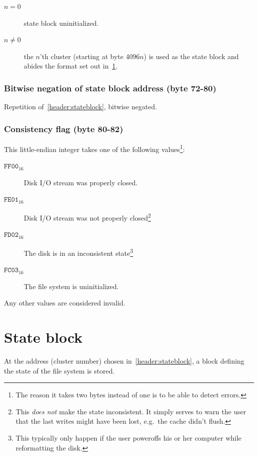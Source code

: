 \documentclass[11pt,a4paper]{report}
\newcommand{\clustersize}{4096 }
\begin{document}
        \begin{description}
            \item [$n = 0$]    state block uninitialized.
            \item [$n \neq 0$] the $n$'th cluster (starting at byte
                $\clustersize n$) is used as the state block and abides the
                format set out in~\ref{stateblock}.
        \end{description}

        \subsection{Bitwise negation of state block address (byte 72-80)}
        Repetition of~\ref{header:stateblock}, bitwise negated.

        \subsection{Consistency flag (byte 80-82)}
        \label{header:consistency}
        This little-endian integer takes one of the following
        values\footnote{The reason it takes two bytes instead of one is to be
        able to detect errors.}:

        \begin{description}
            \item [$\texttt{FF00}_{16}$] Disk I/O stream was properly closed.
            \item [$\texttt{FE01}_{16}$] Disk I/O stream was not properly
                closed\footnote{This \emph{does not} make the state
                inconsistent. It simply serves to warn the user that the last
                writes might have been lost, e.g.\ the cache didn't flush.}
            \item [$\texttt{FD02}_{16}$] The disk is in an inconsistent
                state\footnote{This typically only happen if the user poweroffs
                his or her computer while reformatting the disk.}
            \item [$\texttt{FC03}_{16}$] The file system is uninitialized.
        \end{description}

        Any other values are considered invalid.

    \chapter{State block}
    \label{stateblock}
    At the address (cluster number) chosen in~\ref{header:stateblock}, a block
    defining the state of the file system is stored.
\end{document}
